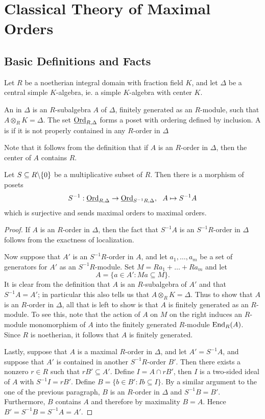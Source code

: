 \section{Classical Theory of Maximal Orders}
\subsection{Basic Definitions and Facts}
Let $R$ be a noetherian integral domain with fraction field $K$, and let $\Delta$ be a central simple $K$-algebra, ie. a simple $K$-algebra with center $K$.
\begin{defn}
An  in $\Delta$ is an $R$-subalgebra $A$ of $\Delta$, finitely generated as an $R$-module, such that $A\otimes_R K = \Delta$.  The set $\textnormal{\underline{Ord}}_{R,\Delta}$ forms a poset with ordering defined by inclusion.  A  is  if it is not properly contained in any $R$-order in $\Delta$
\end{defn}
Note that it follows from the definition that if $A$ is an $R$-order in $\Delta$, then the center of $A$ contains $R$.
\begin{lem}
Let $S\subseteq R\backslash\{0\}$ be a multiplicative subset of $R$.  Then there is a morphism of posets
$$S^{-1}: \textnormal{\underline{Ord}}_{R,\Delta}\rightarrow \textnormal{\underline{Ord}}_{S^{-1}R,\Delta},\ \ A\mapsto S^{-1}A$$
which is surjective and sends maximal orders to maximal orders.
\end{lem}
\begin{proof}
If $A$ is an $R$-order in $\Delta$, then the fact that $S^{-1}A$ is an $S^{-1}R$-order in $\Delta$ follows from the exactness of localization.

Now suppose that $A'$ is an $S^{-1}R$-order in $A$, and let $a_1,\dots, a_m$ be a set of generators for $A'$ as an $S^{-1}R$-module.  Set $M = Ra_1 + \dots + Ra_m$ and let
$$A = \{a\in A': Ma\subseteq M\}.$$
It is clear from the definition that $A$ is an $R$-subalgebra of $A'$ and that $S^{-1}A = A'$; in particular this also tells us that $A\otimes_R K = \Delta$.  Thus to show that $A$ is an $R$-order in $\Delta$, all that is left to show is that $A$ is finitely generated as an $R$-module.  To see this, note that the action of $A$ on $M$ on the right induces an $R$-module monomorphism of $A$ into the finitely generated $R$-module $\textnormal{End}_R(A)$.  Since $R$ is noetherian, it follows that $A$ is finitely generated.

Lastly, suppose that $A$ is a maximal $R$-order in $\Delta$, and let $A' = S^{-1}A$, and suppose that $A'$ is contained in another $S^{-1}R$-order $B'$.  Then there exists a nonzero $r\in R$ such that $rB'\subseteq A'$.  Define $I = A\cap rB'$, then $I$ is a two-sided ideal of $A$ with $S^{-1}I=rB'$.  Define $B = \{b\in B': Ib\subseteq I\}$.  By a similar argument to the one of the previous paragraph, $B$ is an $R$-order in $\Delta$ and $S^{-1}B = B'$.  Furthermore, $B$ contains $A$ and therefore by maximality $B = A$.  Hence $B'=S^{-1}B = S^{-1}A = A'$.
\end{proof}

